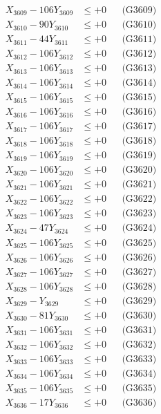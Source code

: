 \documentclass[a4paper,10pt]{article}
\begin{document}
{\begin{align}
X_{3609} - 106Y_{3609} &\leq +0 && \text{(G3609)} \\
X_{3610} - 90Y_{3610} &\leq +0 && \text{(G3610)} \\
\allowbreak
X_{3611} - 44Y_{3611} &\leq +0 && \text{(G3611)} \\
X_{3612} - 106Y_{3612} &\leq +0 && \text{(G3612)} \\
X_{3613} - 106Y_{3613} &\leq +0 && \text{(G3613)} \\
X_{3614} - 106Y_{3614} &\leq +0 && \text{(G3614)} \\
X_{3615} - 106Y_{3615} &\leq +0 && \text{(G3615)} \\
X_{3616} - 106Y_{3616} &\leq +0 && \text{(G3616)} \\
X_{3617} - 106Y_{3617} &\leq +0 && \text{(G3617)} \\
X_{3618} - 106Y_{3618} &\leq +0 && \text{(G3618)} \\
X_{3619} - 106Y_{3619} &\leq +0 && \text{(G3619)} \\
X_{3620} - 106Y_{3620} &\leq +0 && \text{(G3620)} \\
\allowbreak
X_{3621} - 106Y_{3621} &\leq +0 && \text{(G3621)} \\
X_{3622} - 106Y_{3622} &\leq +0 && \text{(G3622)} \\
X_{3623} - 106Y_{3623} &\leq +0 && \text{(G3623)} \\
X_{3624} - 47Y_{3624} &\leq +0 && \text{(G3624)} \\
X_{3625} - 106Y_{3625} &\leq +0 && \text{(G3625)} \\
X_{3626} - 106Y_{3626} &\leq +0 && \text{(G3626)} \\
X_{3627} - 106Y_{3627} &\leq +0 && \text{(G3627)} \\
X_{3628} - 106Y_{3628} &\leq +0 && \text{(G3628)} \\
X_{3629} - Y_{3629} &\leq +0 && \text{(G3629)} \\
X_{3630} - 81Y_{3630} &\leq +0 && \text{(G3630)} \\
\allowbreak
X_{3631} - 106Y_{3631} &\leq +0 && \text{(G3631)} \\
X_{3632} - 106Y_{3632} &\leq +0 && \text{(G3632)} \\
X_{3633} - 106Y_{3633} &\leq +0 && \text{(G3633)} \\
X_{3634} - 106Y_{3634} &\leq +0 && \text{(G3634)} \\
X_{3635} - 106Y_{3635} &\leq +0 && \text{(G3635)} \\
X_{3636} - 17Y_{3636} &\leq +0 && \text{(G3636)} \\

\end{align}}
\end{document}
